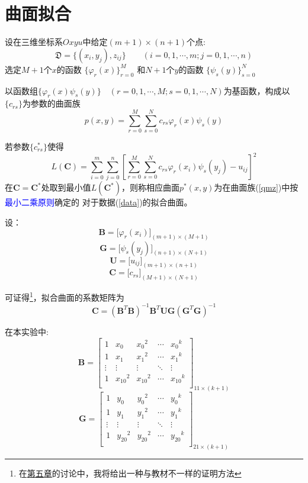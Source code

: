 \newpage
\section{曲面拟合}
\label{sec:qmnh}
设在三维坐标系$Oxyu$中给定$(m+1)\times (n+1)$个点:
\begin{equation}
\label{data}
\mathfrak{D}=\{(x_i,y_j),z_{ij}\}\qquad (i=0,1,\cdots,m;j=0,1,\cdots,n)
\end{equation}
选定$M+1$个$x$的函数
$\{\varphi_{r}(x)\}_{r=0}^M$
和$N+1$个$y$的函数
$\{\psi_{s}(y)\}_{s=0}^N$

以函数组$\{\varphi_{r}(x)\psi_{s}(y)\}\quad (r=0,1,\cdots,M;s=0,1,\cdots,N)$为基函数，构成以$\{c_{rs}\}$为参数的曲面族
\begin{equation}
\label{qmz}
p(x,y) = \sum_{r = 0}^M \sum_{s = 0}^N c_{rs}\varphi_{r}(x)\psi_{s}(y)
\end{equation}
 
若参数$\{ c^{\ast}_{rs}\}$使得
\begin{equation}
\label{cost}
L(\bm{C})=\sum\limits_{i = 0}^{m} {\sum\limits_{j = 0}^{n} \left[{\sum_{r = 0}^M \sum_{s = 0}^N c_{rs}\varphi_{r}(x_i)\psi_{s}(y_j) - u_{ij}}\right]^2} 
\end{equation}
在$\bm{C}=\bm{C}^{\ast}$处取到最小值$L(\bm{C}^{\ast})$，则称相应曲面$p^{\ast}(x,y)$为在曲面族(\ref{qmz})中按
\textcolor{blue}{最小二乘原则}确定的
对于数据(\ref{data})的拟合曲面。

设：
\[\bm{B} =\big[\varphi_{r}(x_i)\big]_{(m+1)\times (M+1)}\]
\[\bm{G} =\big[\psi_{s}(y_j)\big]_{(n+1)\times (N+1)}\]
\[\bm{U} =\big[u_{ij}\big]_{(m+1)\times (n+1)}\]
\[\bm{C} =\big[c_{rs}\big]_{(M+1)\times (N+1)}\]

可证得\footnote{在\hyperref[sec:discuss]{第五章}的讨论中，我将给出一种与教材不一样的证明方法}，拟合曲面的系数矩阵为
\begin{equation}
\label{c}
\bm{C}=(\bm{B}^T\bm{B})^{-1}\bm{B}^T\bm{U}\bm{G}(\bm{G}^T\bm{G})^{-1}
\end{equation}

在本实验中:
\[\bm{B}=
\begin{bmatrix}
1&{x_0}&{x_0}^{2}& \cdots &{x_0}^{k}\\
1&{x_1}&{x_1}^{2}& \cdots &{x_1}^{k}\\
 \vdots & \vdots & \vdots & \ddots & \vdots \\
1&{x_{10}}^2&{x_{10}}^{2}& \cdots &{x_{10}}^{k}\\
\end{bmatrix}_{11\times (k+1)}\]
\[\bm{G}=
\begin{bmatrix}
1&{y_0}&{y_0}^{2}& \cdots &{y_0}^{k}\\
1&{y_1}&{y_1}^{2}& \cdots &{y_1}^{k}\\
 \vdots & \vdots & \vdots & \ddots & \vdots \\
1&{y_{20}}^2&{y_{20}}^{2}& \cdots &{y_{20}}^{k}\\
\end{bmatrix}_{21\times (k+1)}\]

